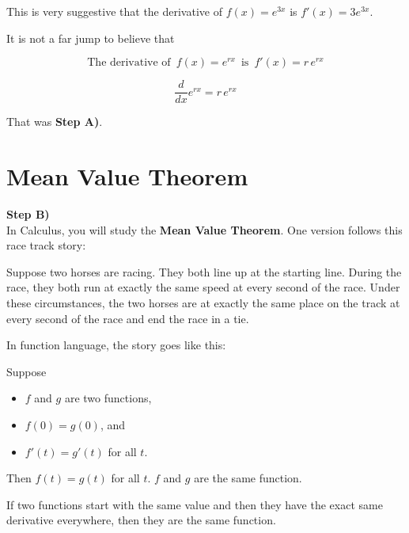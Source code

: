 \documentclass{ximera}
\begin{document}
This is very suggestive that the derivative of $f(x) = e^{3 x}$ is $f'(x) = 3 e^{3 x}$.

It is not a far jump to believe that 



\[
\text{The derivative of } \, f(x) = e^{r x} \, \text{ is } \, f'(x) = r \, e^{r x}
\]


\[
\frac{d}{dx} e^{r x}  = r \, e^{r x}
\]





That was \textbf{\textcolor{purple!85!blue}{Step A)}}. \\





\section{Mean Value Theorem}

\textbf{\textcolor{purple!85!blue}{Step B)}} \\

In Calculus, you will study the \textbf{Mean Value Theorem}. One version follows this race track story:


Suppose two horses are racing.  They both line up at the starting line.  During the race, they both run at exactly the same speed at every second of the race.  Under these circumstances, the two horses are at exactly the same place on the track at every second of the race and end the race in a tie.




In function language, the story goes like this:

Suppose 

\begin{itemize}
\item $f$ and $g$ are two functions,
\item $f(0) = g(0)$, and
\item $f'(t) = g'(t)$  for all $t$.
\end{itemize}

Then $f(t)=g(t)$ for all $t$.   $f$ and $g$ are the same function.



If two functions start with the same value and then they have the exact same derivative everywhere, then they are the same function. \\
\end{document}
